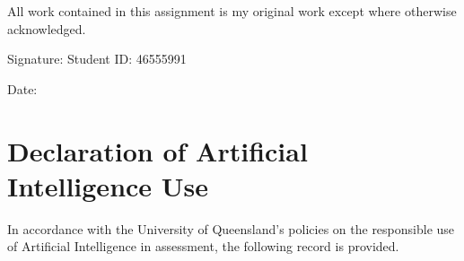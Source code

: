 \documentclass[11pt,a4paper]{article}
\begin{document}
\noindent All work contained in this assignment is my original work except where otherwise acknowledged.
\vspace{8mm}

\noindent Signature: \underline{\hspace{6.5cm}} \hfill Student ID: 46555991
\vspace{3mm}

\noindent Date: \underline{\hspace{4cm}}

\newpage
\section*{Declaration of Artificial Intelligence Use}
In accordance with the University of Queensland's policies on the responsible use of Artificial Intelligence in assessment, the following record is provided.
\end{document}
